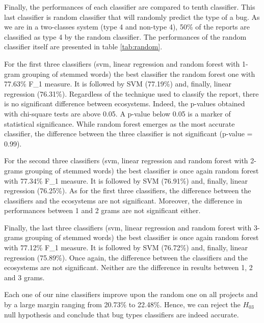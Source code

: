 \documentclass[natbib]{svjour3}
\begin{document}
Finally, the performances of each classifier are compared to tenth
classifier. This last classifier is random classifier that will randomly
predict the type of a bug. As we are in a two-classes system (type 4 and
non-type 4), 50\% of the reports are classified as type 4 by the random
classifier. The performances of the random classifier itself are
presented in table \ref{tab:random}.



For the first three classifiers (svm, linear regression and random
forest with 1-gram grouping of stemmed words) the best classifier the
random forest one with 77.63\% F\_1 measure. It is followed by SVM
(77.19\%) and, finally, linear regression (76.31\%). Regardless of the
technique used to classify the report, there is no significant
difference between ecosystems. Indeed, the p-values obtained with
chi-square tests are above 0.05. A p-value below 0.05 is a marker of
statistical significance. While random forest emerges as the most
accurate classifier, the difference between the three classifier is not
significant (p-value = 0.99).



For the second three classifiers (svm, linear regression and random
forest with 2-grams grouping of stemmed words) the best classifier is
once again random forest with 77.34\% F\_1 measure. It is followed by
SVM (76.91\%) and, finally, linear regression (76.25\%). As for the
first three classifiers, the difference between the classifiers and the
ecosystems are not significant. Moreover, the difference in performances
between 1 and 2 grams are not significant either.



Finally, the last three classifiers (svm, linear regression and random
forest with 3-grams grouping of stemmed words) the best classifier is
once again random forest with 77.12\% F\_1 measure. It is followed by
SVM (76.72\%) and, finally, linear regression (75.89\%). Once again, the
difference between the classifiers and the ecosystems are not
significant. Neither are the difference in results between 1, 2 and 3
grams.



Each one of our nine classifiers improve upon the random one on all
projects and by a large margin ranging from 20.73\% to 22.48\%. Hence,
we can reject the \(H_{03}\) null hypothesis and conclude that bug types
classifiers are indeed accurate.
\end{document}
